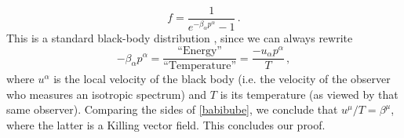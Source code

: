 \documentclass[a4paper, amsfonts, amssymb, amsmath, reprint, showkeys, nofootinbib, twoside, onecolumn,notitlepage]{revtex4-1}
\theoremstyle{definition}
\theoremstyle{theorem}
\begin{document}
\begin{equation}
f=\dfrac{1}{e^{-\beta_\alpha p^\alpha}-1} \, .
\end{equation}
This is a standard black-body distribution \cite{UdeyIsrael1982}, since we can always rewrite 
\begin{equation}\label{babibube}
-\beta_\alpha p^\alpha =\dfrac{\text{``Energy''}}{\text{``Temperature''}}= \dfrac{-u_\alpha p^\alpha}{T} \, ,
\end{equation}
where $u^\alpha$ is the local velocity of the black body (i.e. the velocity of the observer who measures an isotropic spectrum) and $T$ is its temperature (as viewed by that same observer). Comparing the sides of \eqref{babibube}, we conclude that $u^\mu/T=\beta^\mu$, where the latter is a Killing vector field. This concludes our proof.





\label{lastpage}
\end{document}
